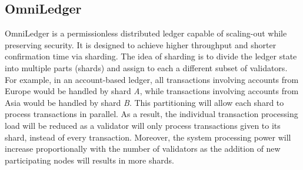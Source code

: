 \subsection{OmniLedger}
OmniLedger is a permissionless distributed ledger capable of scaling-out while preserving security. It is designed to achieve higher throughput and shorter confirmation time via sharding. The idea of sharding is to divide the ledger state into multiple parts (shards) and assign to each a different subset of validators. For example, in an account-based ledger, all transactions involving accounts from Europe would be handled by shard \textit{A}, while transactions involving accounts from Asia would be handled by shard \textit{B}. This partitioning will allow each shard to process transactions in parallel. As a result, the individual transaction processing load will be reduced as a validator will only process transactions given to its shard, instead of every transaction. Moreover, the system processing power will increase proportionally with the number of validators as the addition of new participating nodes will results in more shards. \\\\
